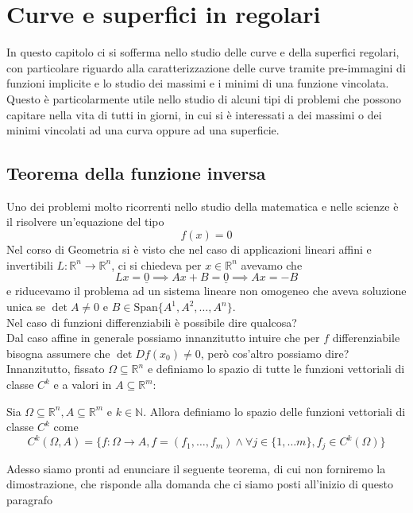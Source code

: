 \documentclass[openany, italian]{book}
\begin{document}
\chapter{Curve e superfici in regolari}
In questo capitolo ci si sofferma nello studio delle curve e della superfici regolari, con particolare riguardo alla caratterizzazione delle curve tramite pre-immagini di funzioni implicite e lo studio dei massimi e i minimi di una funzione vincolata. Questo è particolarmente utile nello studio di alcuni tipi di problemi che possono capitare nella vita di tutti in giorni, in cui si è interessati a dei massimi o dei minimi vincolati ad una curva oppure ad una superficie.

\section{Teorema della funzione inversa}
Uno dei problemi molto ricorrenti nello studio della matematica e nelle scienze è il risolvere un'equazione del tipo
$$
f(x) = 0
$$
Nel corso di Geometria si è visto che nel caso di applicazioni lineari affini e invertibili $L: \mathbb{R}^n \to \mathbb{R}^n$, ci si chiedeva per $x \in \mathbb{R}^n$ avevamo che
$$
Lx = \underline{0} \implies Ax + B = \underline{0} \implies Ax = -B
$$
e riducevamo il problema ad un sistema lineare non omogeneo che aveva soluzione unica se $\det{A} \neq 0$ e $B \in \text{Span}\{ A^1, A^2, \ldots, A^n \}$. \\
Nel caso di funzioni differenziabili è possibile dire qualcosa? \\
Dal caso affine in generale possiamo innanzitutto intuire che per $f$ differenziabile bisogna assumere che $\det{Df(x_0)} \neq 0$, però cos'altro possiamo dire? \\
Innanzitutto, fissato $\Omega \subseteq \mathbb{R}^n$ e definiamo lo spazio di tutte le funzioni vettoriali di classe $C^k$ e a valori in $A \subseteq \mathbb{R}^m$:
\begin{definition}
Sia $\Omega \subseteq \mathbb{R}^n, A \subseteq \mathbb{R}^m$ e $k \in \mathbb{N}$. Allora definiamo lo spazio delle funzioni vettoriali di classe $C^k$ come
$$
C^k(\Omega,A) = \{f: \Omega \to A, f = (f_1, \ldots, f_m) \wedge \forall j \in \{1, \ldots m \}, f_j \in C^k(\Omega) \}
$$
\end{definition}
Adesso siamo pronti ad enunciare il seguente teorema, di cui non forniremo la dimostrazione, che risponde alla domanda che ci siamo posti all'inizio di questo paragrafo
\end{document}
